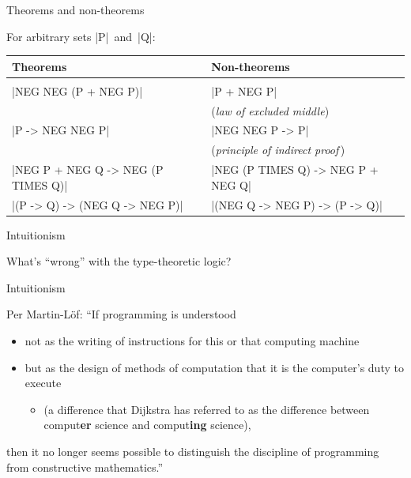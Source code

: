 \documentclass[t,compress,hyperref={hidelinks}]{beamer}
\renewcommand{\emph}[1]{\textit{\color{OxfordRed}#1}}
\begin{document}
\begin{frame}{Theorems and non-theorems}

For arbitrary sets |P|~and~|Q|:
\begin{center}
\begin{tabular}{ll}
Theorems & Non-theorems \\ \hline \\[-2ex]
|NEG NEG (P + NEG P)| & |P + NEG P| \\
& (\emph{law of excluded middle}) \\
|P -> NEG NEG P| & |NEG NEG P -> P| \\
& (\emph{principle of indirect proof}\,) \\
|NEG P + NEG Q -> NEG (P TIMES Q)| & |NEG (P TIMES Q) -> NEG P + NEG Q| \\
|(P -> Q) -> (NEG Q -> NEG P)| & |(NEG Q -> NEG P) -> (P -> Q)|
\end{tabular}
\end{center}

\end{frame}

\begin{frame}{Intuitionism}

What's ``wrong'' with the type-theoretic logic?



\end{frame}

\begin{frame}{Intuitionism}

Per Martin-Löf: ``If programming is understood
\vspace*{-.5ex}
\begin{itemize}
\item not as the writing of instructions for this or that computing machine
\item but as the design of methods of computation that it is the computer's duty to execute
\vspace*{1ex}
\begin{itemize}
\item (a difference that Dijkstra has referred to as the difference between comput\textbf{er} science and comput\textbf{ing} science),
\end{itemize}
\end{itemize}
\vspace*{-.5ex}
then it no longer seems possible to distinguish the discipline of programming from constructive mathematics.''

\end{frame}
\end{document}
